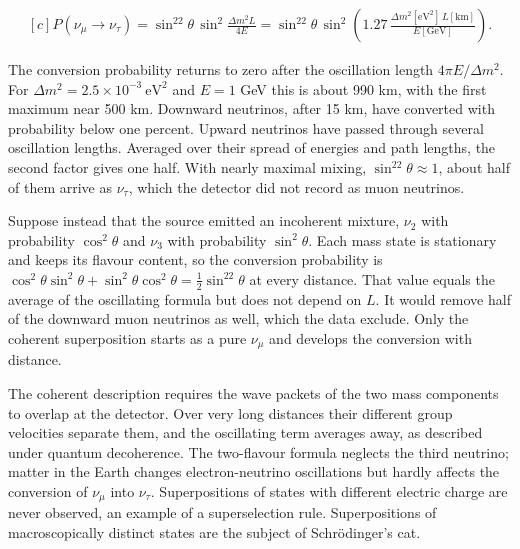 \documentclass[11pt,oneside]{book}
\newenvironment{centeredalign}{\[\begin{gathered}[c]}{\end{gathered}\]}
\begin{document}
\begin{centeredalign}
P(\nu_\mu\to\nu_\tau)=\sin^22\theta\,\sin^2\frac{\Delta m^2L}{4E}
=\sin^22\theta\,\sin^2\!\left(1.27\,\frac{\Delta m^2[\mathrm{eV}^2]\,L[\mathrm{km}]}{E[\mathrm{GeV}]}\right).
\end{centeredalign}

The conversion probability returns to zero after the oscillation length \(4\pi E/\Delta m^2\). For \(\Delta m^2=2.5\times10^{-3}\ \mathrm{eV}^2\) and \(E=1\) GeV this is about 990 km, with the first maximum near 500 km. Downward neutrinos, after 15 km, have converted with probability below one percent. Upward neutrinos have passed through several oscillation lengths. Averaged over their spread of energies and path lengths, the second factor gives one half. With nearly maximal mixing, \(\sin^22\theta\approx1\), about half of them arrive as \(\nu_\tau\), which the detector did not record as muon neutrinos.

Suppose instead that the source emitted an incoherent mixture, \(\nu_2\) with probability \(\cos^2\theta\) and \(\nu_3\) with probability \(\sin^2\theta\). Each mass state is stationary and keeps its flavour content, so the conversion probability is \(\cos^2\theta\sin^2\theta+\sin^2\theta\cos^2\theta=\tfrac12\sin^22\theta\) at every distance. That value equals the average of the oscillating formula but does not depend on \(L\). It would remove half of the downward muon neutrinos as well, which the data exclude. Only the coherent superposition starts as a pure \(\nu_\mu\) and develops the conversion with distance.

The coherent description requires the wave packets of the two mass components to overlap at the detector. Over very long distances their different group velocities separate them, and the oscillating term averages away, as described under quantum decoherence. The two-flavour formula neglects the third neutrino; matter in the Earth changes electron-neutrino oscillations but hardly affects the conversion of \(\nu_\mu\) into \(\nu_\tau\). Superpositions of states with different electric charge are never observed, an example of a superselection rule. Superpositions of macroscopically distinct states are the subject of Schrödinger's cat.
\end{document}

